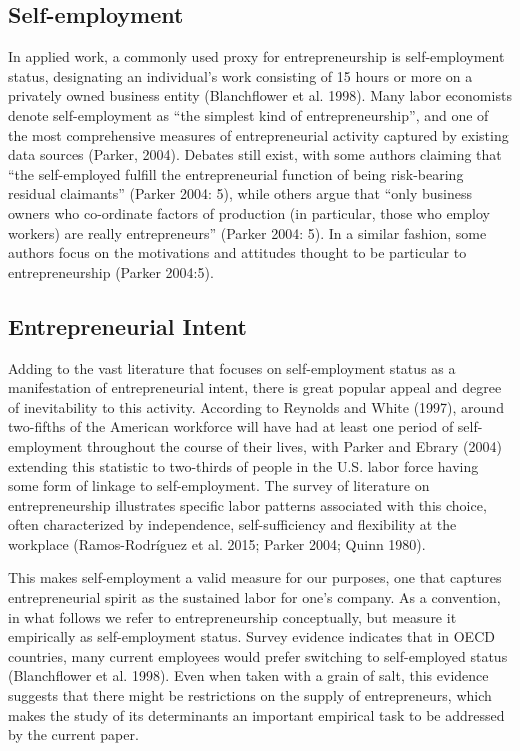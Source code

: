 \subsection{Self-employment}

In applied work, a commonly used proxy for entrepreneurship is self-employment status, designating an individual's work consisting of 15 hours or more on a privately owned business entity (Blanchflower et al. 1998). Many labor economists denote self-employment as “the simplest kind of entrepreneurship”, and one of the most comprehensive measures of entrepreneurial activity captured by existing data sources (Parker, 2004). Debates still exist, with some authors claiming that “the self-employed fulfill the entrepreneurial function of being risk-bearing residual claimants” (Parker 2004: 5), while others argue that “only business owners who co-ordinate factors of production (in particular, those who employ workers) are really entrepreneurs” (Parker 2004: 5). In a similar fashion, some authors focus on the motivations and attitudes thought to be particular to entrepreneurship (Parker 2004:5).

\subsection{Entrepreneurial Intent}

Adding to the vast literature that focuses on self-employment status as a manifestation of entrepreneurial intent, there is great popular appeal and degree of inevitability to this activity.  According to Reynolds and White (1997), around two-fifths of the American workforce will have had at least one period of self-employment throughout the course of their lives, with Parker and Ebrary (2004) extending this statistic to two-thirds of people in the U.S. labor force having some form of linkage to self-employment. The survey of literature on entrepreneurship illustrates specific labor patterns associated with this choice, often characterized by independence, self-sufficiency and flexibility at the workplace (Ramos-Rodríguez et al. 2015; Parker 2004; Quinn 1980). 

This makes self-employment a valid measure for our purposes, one that captures entrepreneurial spirit as the sustained labor for one's company. As a convention, in what follows we refer to entrepreneurship conceptually, but measure it empirically as self-employment status.  Survey evidence indicates that in OECD countries, many current employees would prefer switching to self-employed status (Blanchflower et al. 1998). Even when taken with a grain of salt, this evidence suggests that there might be restrictions on the supply of entrepreneurs, which makes the study of its determinants an important empirical task to be addressed by the current paper. 


